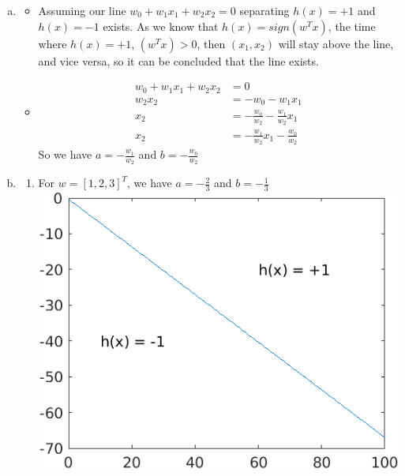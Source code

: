 \documentclass{article}
\def\math#1{$#1$}
\begin{document}
\begin{enumerate}[a)]
    \item 
        \begin{itemize}
            \item Assuming our line \math{w_0 + w_1x_1 + w_2x_2 = 0} separating \math{h(x) = +1} and \math{h(x) = -1} exists. As we know that \math{h(x) = sign(w^Tx)}, the time where \math{h(x) = + 1}, \math{(w^Tx) > 0 }, then \math{(x_1, x_2)} will stay above the line, and vice versa, so it can be concluded that the line exists. 
            \item \begin{equation}
                \begin{split}
                    w_0 + w_1x_1 + w_2x_2 &= 0 \\
                    w_2x_2 &= -w_0 - w_1x_1 \\
                    x_2 &= -\frac{w_0}{w_2} - \frac{w_1}{w_2}x_1 \\
                    x_2 &= -\frac{w_1}{w_2}x_1 -\frac{w_0}{w_2}
                \end{split}
            \end{equation}
            So we have \math{a = -\frac{w_1}{w_2}} and \math{b = -\frac{w_0}{w_2}}
        \end{itemize}
    \item 
        \begin{enumerate}[1)]
            \item For \math{w = [1,2,3]^T}, we have \math{a = - \frac{2}{3}} and \math{b = - \frac{1}{3}} \\
            \includegraphics{1.2/1}

\end{enumerate}
\end{enumerate}
\end{document}
